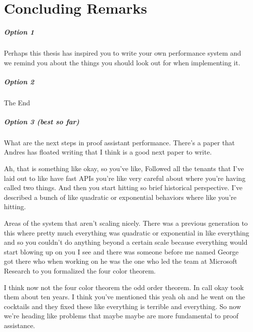 \chapter{Concluding Remarks}

\paragraph{Option 1}
Perhaps this thesis has inspired you to write your own performance system and we remind you about the things you should look out for when implementing it. 

\paragraph{Option 2}

The End


\paragraph{Option 3 (best so far)}

What are the next steps in proof assistant performance.  There's a paper that Andres has floated writing that I think is a good next paper to write. 

Ah, that is something like okay, so you've like, Followed all the tenants that I've laid out to like have fast APIs you're like very careful about where you're having called two things. And then you start hitting so brief historical perspective. I've described a bunch of like quadratic or exponential behaviors where like you're hitting. 

Areas of the system that aren't scaling nicely. There was a previous generation to this where pretty much everything was quadratic or exponential in like everything and so you couldn't do anything beyond a certain scale because everything would start blowing up on you I see and there was someone before me named George got there who when working on he was the one who led the team at Microsoft Research to you formalized the four color theorem. 

I think now not the four color theorem the odd order theorem. In call okay took them about ten years. I think you've mentioned this yeah oh and he went on the cocktails and they fixed these like everything is terrible and everything. So now we're heading like problems that maybe maybe are more fundamental to proof assistance. 

